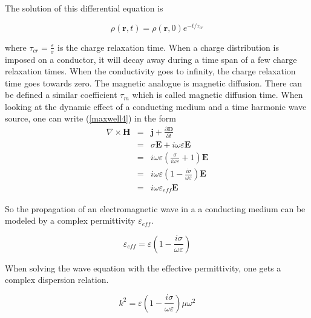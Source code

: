 \documentclass[a4paper,14pt]{extbook}
\begin{document}
The solution of this differential equation is

\begin{equation}\label{relax_equation}
    \rho(\mathbf{r},t)=\rho(\mathbf{r},0)e^{-t/ \tau_{cr}}
\end{equation}

where $\tau_{cr}=\frac{\varepsilon}{\sigma}$ is the charge relaxation time. When a charge distribution is imposed on a conductor, it will decay away during a time span of a few charge relaxation times. When the conductivity goes to infinity, the charge relaxation time goes towards zero. The magnetic analogue is magnetic diffusion. There can be defined a similar coefficient $\tau_{m}$ which is called magnetic diffusion time. When looking at the dynamic effect of a conducting medium and a time harmonic wave source, one can write (\ref{maxwell4}) in the form\\

\begin{eqnarray}
\nabla \times \mathbf{H}&=&\mathbf{j}+ \frac{\partial \mathbf{D}}{\partial t}  \nonumber \label{maxwell4_conducting medium}\\
&=&\sigma \mathbf{E}+ i \omega \varepsilon \mathbf{E} \nonumber \\
&=&i \omega\varepsilon\left( \frac{\sigma}{i \omega \varepsilon} +  1 \right)\mathbf{E} \nonumber \\
&=&i \omega \varepsilon\left( 1- \frac{ i\sigma}{ \omega \varepsilon} \right)\mathbf{E} \nonumber \\
&=&i \omega \varepsilon_{eff}\mathbf{E}
\end{eqnarray}

So the propagation of an electromagnetic wave in a a conducting medium can be modeled by a complex permittivity $\varepsilon_{eff}$.

\begin{equation}\label{complex_permittivity}
    \varepsilon_{eff}=\varepsilon\left( 1- \frac{ i\sigma}{ \omega \varepsilon}\right)
\end{equation}

When solving the wave equation with the effective permittivity, one gets a complex dispersion relation.

\begin{equation}\label{dispersionrelarion_complex}
    k^2 = \varepsilon\left( 1- \frac{ i\sigma}{ \omega \varepsilon}\right) \mu  \omega^2
\end{equation}
\end{document}
